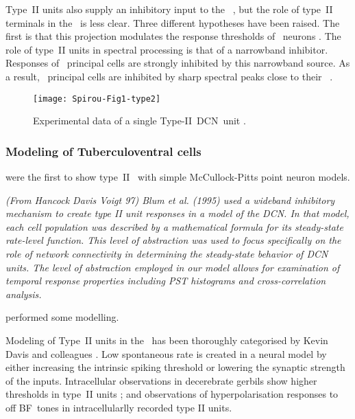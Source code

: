 
Type~II units also supply an inhibitory input to the \VCN~\citep{WickesbergOertel:1990}, but the role of type~II terminals in the \VCN~is less clear.
Three different hypotheses have been raised.
The ﬁrst is that this projection modulates the response thresholds of \VCN~neurons \citep{PaoliniClark:1998}.
The role of type~II units in spectral processing is that of a narrowband inhibitor. Responses of \DCN~principal cells are strongly inhibited by this narrowband source.
As a result, \DCN~principal cells are inhibited by sharp spectral peaks close to their \BF~\citep{SpirouDavisEtAl:1999}.


\begin{figure}[htb]
  \centering
  \texttt{[image: Spirou-Fig1-type2]}
  \caption[Experimental data of a single Type-II~DCN~unit]{Experimental data of a single Type-II~DCN~unit \citep[Fig.~1]{SpirouDavisEtAl:1999}.}   \label{fig:SpirouFig1}
\end{figure}


\subsubsection{Modeling of Tuberculoventral cells}



\citet{ArleKim:1991a} were the first to show type~II \EIRA~with simple McCullock-Pitts point neuron models.


{\it (From Hancock Davis Voigt 97) Blum et al. (1995) used a wideband inhibitory   mechanism to create type II unit responses in a model of the DCN. In that   model, each cell population was described by a mathematical formula for its   steady-state rate-level function. This level of abstraction was used to focus   specifically on the role of network connectivity in determining the   steady-state behavior of DCN units. The level of abstraction employed in our   model allows for examination of temporal response properties including PST   histograms and cross-correlation analysis.}

\citep{DunnVetterEtAl:1996} performed some modelling.


Modeling of Type~II units in the \DCN~has been thoroughly categorised by Kevin Davis and colleagues \citep{YoungDavis:2002,HancockDavisEtAl:2001,DavisYoung:2000,SpirouDavisEtAl:1999,HancockDavisEtAl:1997,DavisVoigt:1996,DavisVoigt:1994,DavisVoigt:1991}.
 Low spontaneous rate is created in a neural model by either increasing the intrinsic spiking threshold or lowering the synaptic strength of the inputs.
Intracellular observations in decerebrate gerbils show higher thresholds in type~II units \citep{DingVoigt:1997}; and observations of hyperpolarisation responses to off \gls{BF}~tones in intracellularlly recorded type II units.

